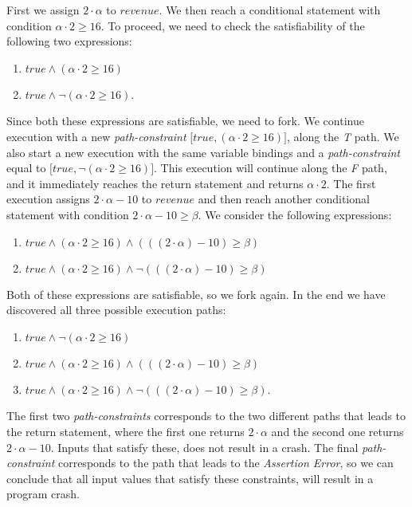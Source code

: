 		First we assign $2\cdot \alpha$ to $revenue$. We then reach a conditional statement with condition $\alpha \cdot 2 \geq 16$. To proceed, we need to check the satisfiability of the following two expressions:
		\begin{enumerate}
			\item $true \land (\alpha \cdot 2 \geq 16)$
			\item $true \land \neg (\alpha \cdot 2 \geq 16)$.
		\end{enumerate}
		Since both these expressions are satisfiable, we need to fork. We continue execution with a new  \emph{path-constraint} $\lbrack true, (\alpha \cdot 2 \geq 16) \rbrack$, along the \emph{T} path. We also start a new execution with the same variable bindings and a \emph{path-constraint} equal to $\lbrack true, \neg (\alpha \cdot 2 \geq 16) \rbrack$. This execution will continue along the \emph{F} path, and it immediately reaches the return statement and returns $\alpha \cdot 2$.
		The first execution assigns $2\cdot \alpha - 10$ to $revenue$ and then reach another conditional statement with condition $2\cdot \alpha - 10 \geq \beta$. We consider the following expressions:
		\begin{enumerate}
			\item $true \land (\alpha \cdot 2 \geq 16) \land (((2\cdot \alpha) - 10) \geq \beta)$
			\item $true \land (\alpha \cdot 2 \geq 16) \land \neg (((2\cdot \alpha) - 10) \geq \beta)$
		\end{enumerate}
		Both of these expressions are satisfiable, so we fork again. In the end we have discovered all three possible execution paths:
		\begin{enumerate}
			\item $true \land \neg (\alpha \cdot 2 \geq 16)$
			\item $true \land (\alpha \cdot 2 \geq 16) \land (((2\cdot \alpha) - 10) \geq \beta)$
			\item $true \land (\alpha \cdot 2 \geq 16) 
			\land \neg (((2\cdot \alpha) - 10) \geq \beta)$.
		\end{enumerate}
		
		The first two \emph{path-constraints} corresponds to the two different paths that leads to the return statement, where the first one returns $2\cdot \alpha$ and the second one returns $2\cdot \alpha - 10$. Inputs that satisfy these, does not result in a crash.
		The final \emph{path-constraint} corresponds to the path that leads to the \textsl{Assertion Error}, so we can conclude that all input values that satisfy these constraints, will result in a program crash.
	
